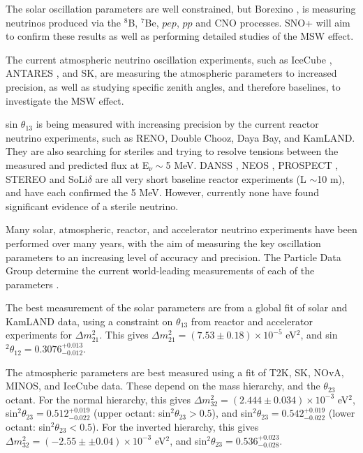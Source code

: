 The solar oscillation parameters are well constrained, but Borexino \cite{borexino}, is measuring neutrinos produced via the $^8$B, $^7$Be, $pep$, $pp$ and CNO processes. SNO+ \cite{snoplus} will aim to confirm these results as well as performing detailed studies of the MSW effect.

The current atmospheric neutrino oscillation experiments, such as IceCube \cite{icecube}, ANTARES \cite{antares}, and SK, are measuring the atmospheric parameters to increased precision, as well as studying specific zenith angles, and therefore baselines, to investigate the MSW effect.

sin $\theta_{13}$ is being measured with increasing precision by the current reactor neutrino experiments, such as RENO, Double Chooz, Daya Bay, and KamLAND. They are also searching for steriles and trying to resolve tensions between the measured and predicted flux at E$_\nu\sim$5 MeV. DANSS \cite{danss}, NEOS \cite{neos}, PROSPECT \cite{prospect}, STEREO \cite{stereo} and SoLi$\delta$ \cite{solid} are all very short baseline reactor experiments (L $\sim$10 m), and have each confirmed the 5 MeV. However, currently none have found significant evidence of a sterile neutrino.

Many solar, atmospheric, reactor, and accelerator neutrino experiments have been performed over many years, with the aim of measuring the key oscillation parameters to an increasing level of accuracy and precision. The Particle Data Group determine the current world-leading measurements of each of the parameters \cite{pdg}.

The best measurement of the solar parameters are from a global fit of solar and KamLAND data, using a constraint on $\theta_{13}$ from reactor and accelerator experiments for $\Delta m_{21}^2$. This gives $\Delta m_{21}^2 = (7.53\pm 0.18) \times 10^{−5}$ eV$^2$, and sin$^2\theta_{12} = 0.3076^{+0.013}_{−0.012}$.  

The atmospheric parameters are best measured using a fit of T2K, SK, NOvA, MINOS, and IceCube data. These depend on the mass hierarchy, and the $\theta_{23}$ octant. For the normal hierarchy, this gives $\Delta m_{32}^2 = (2.444\pm 0.034) \times 10^{−3}$ eV$^2$, sin$^2 \theta_{23} = 0.512^{+0.019}_{−0.022}$ (upper octant: sin$^2 \theta_{23} > 0.5$), and sin$^2 \theta_{23} = 0.542^{+0.019}_{−0.022}$ (lower octant: sin$^2 \theta_{23} < 0.5$). For the inverted hierarchy, this gives $\Delta m_{32}^2 = (-2.55\pm±0.04) \times 10^{−3}$ eV$^2$, and sin$^2 \theta_{23} = 0.536^{+0.023}_{−0.028}$.

